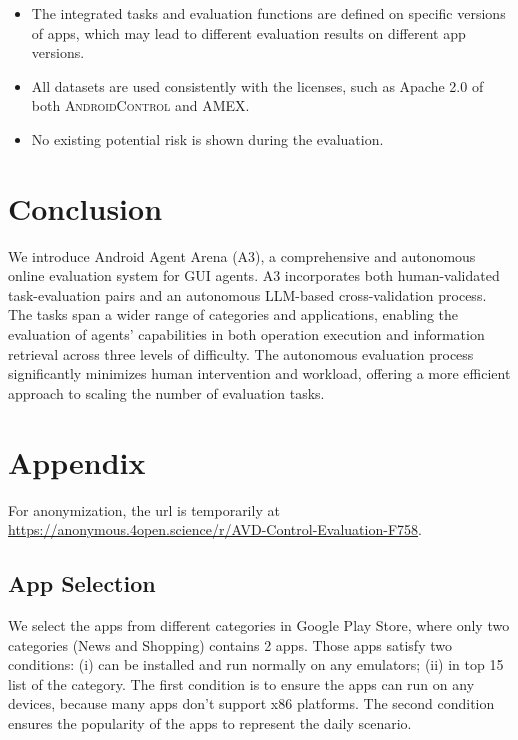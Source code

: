 \documentclass[11pt]{article}
\begin{document}
\begin{itemize}[leftmargin=5mm]
    \item The integrated tasks and evaluation functions are defined on specific versions of apps, which may lead to different evaluation results on different app versions.
    \item All datasets are used consistently with the licenses, such as Apache 2.0 of both \textsc{AndroidControl} and AMEX.
    \item No existing potential risk is shown during the evaluation.
\end{itemize}

\section{Conclusion}

We introduce Android Agent Arena (A3), a comprehensive and autonomous online evaluation system for GUI agents. A3 incorporates both human-validated task-evaluation pairs and an autonomous LLM-based cross-validation process. The tasks span a wider range of categories and applications, enabling the evaluation of agents' capabilities in both operation execution and information retrieval across three levels of difficulty. The autonomous evaluation process significantly minimizes human intervention and workload, offering a more efficient approach to scaling the number of evaluation tasks.




%


\appendix

\section{Appendix}

For anonymization, the url is temporarily at \url{https://anonymous.4open.science/r/AVD-Control-Evaluation-F758}.

\subsection{App Selection}
\label{app:app-selection}

We select the apps from different categories in Google Play Store, where only two categories (News and Shopping) contains 2 apps. Those apps satisfy two conditions: (i) can be installed and run normally on any emulators; (ii) in top 15 list of the category. The first condition is to ensure the apps can run on any devices, because many apps don't support x86 platforms. The second condition ensures the popularity of the apps to represent the daily scenario.
\end{document}
